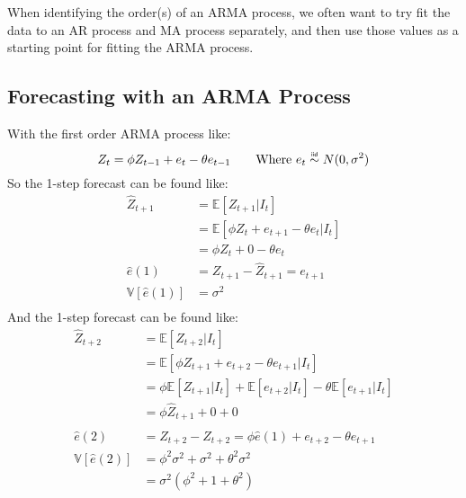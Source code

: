 When identifying the order(s) of an ARMA process, we often want to try fit the
data to an AR process and MA process separately, and then use those values as a
starting point for fitting the ARMA process.

\subsection{Forecasting with an ARMA Process}
With the first order ARMA process like:
\begin{equation*}
    Z_{t} = \phi Z_{t-1} + e_{t} - \theta e_{t-1} \qquad \text{Where $e_t \iid N(0, \sigma^2)$}
\end{equation*}
So the 1-step forecast can be found like:
\begin{equation*}
    \begin{aligned}
        \hat{Z}_{t+1} &= \mathbb{E}\left[Z_{t+1} | I_{t}\right]  \\
                      &= \mathbb{E}\left[\phi Z_{t} + e_{t+1} - \theta e_{t} | I_{t}\right]  \\
                      &= \phi Z_{t} + 0 - \theta e_{t} \\
        \hat{e}(1) &= Z_{t+1} - \hat{Z}_{t+1} = e_{t+1} \\
        \mathbb{V}\left[ \hat{e}(1)\right] &= \sigma^{2}\\
    \end{aligned}
\end{equation*}
And the 1-step forecast can be found like:
\begin{equation*}
    \begin{aligned}
        \hat{Z}_{t+2} &= \mathbb{E}\left[Z_{t+2} | I_{t}\right]  \\
                      &= \mathbb{E}\left[\phi Z_{t+1} + e_{t+2} - \theta e_{t+1} | I_{t}\right]  \\
                      &= \phi \mathbb{E}\left[Z_{t+1} | I_{t}\right]  + \mathbb{E}\left[e_{t+2} | I_{t}\right]  - \theta \mathbb{E}\left[e_{t+1} | I_{t}\right]  \\
                      &= \phi \hat{Z}_{t+1} + 0 + 0 \\
        \hat{e}(2) &= Z_{t+2} - \hat{Z}_{t+2} = \phi \hat{e}(1) + e_{t+2} - \theta e_{t+1}\\
        \mathbb{V}\left[ \hat{e}(2)\right] &= \phi^{2}\sigma^{2} + \sigma^{2} + \theta^{2}\sigma^{2}\\
        &= \sigma^{2} \left( \phi^{2} + 1 + \theta^{2}\right) \\
    \end{aligned}
\end{equation*}
